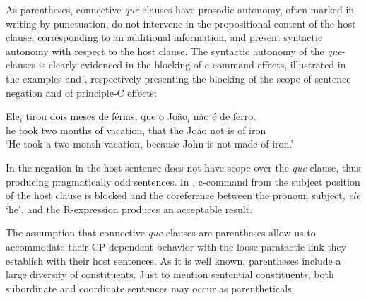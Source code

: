 \documentclass[output=paper,colorlinks,citecolor=brown,
]{langscibook}
\begin{document}
As parentheses, connective \textit{que}-clauses have prosodic autonomy, often marked in writing by punctuation, do not intervene in the propositional content of the host clause, corresponding to an additional information, and present syntactic autonomy with respect to the host clause.
The syntactic autonomy of the \textit{que}-clauses is clearly evidenced in the blocking of c-command effects, illustrated in the examples  and , respectively presenting the blocking of the scope of sentence negation and of principle-C effects:

\ea \label{ex:matos:des}
  \label{ex:matos:nao-des}
  \label{ex:matos:nao-assine}
 \z
\z 

\ea \label{ex:matos:ele-tirou-ferias}
\gll Ele$_i$ tirou dois meses de férias, que o João$_i$ não é de ferro.\\
	 he took two months of vacation, that the João not is of iron\\
\glt ‘He took a two-month vacation, because John is not made of iron.’
\z 

In  the negation in the host sentence does not have scope over the \textit{que}-clause, thus producing pragmatically odd sentences. In , c-command from the subject position of the host clause is blocked and the coreference between the pronoun subject, \textit{ele} ‘he’, and the R-expression produces an acceptable result.

The assumption that connective \textit{que}-clauses are parentheses allow us to accommodate their CP dependent behavior with the loose paratactic link they establish with their host sentences. As it is well known, parentheses include a large diversity of constituents. Just to mention sentential constituents, both subordinate  and coordinate sentences  may occur as parentheticals:
\end{document}
